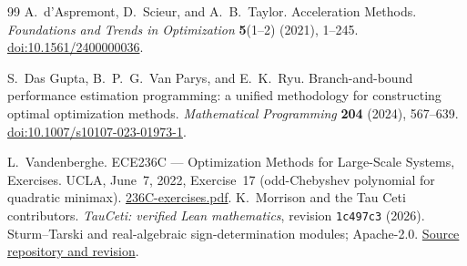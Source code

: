 \documentclass[11pt]{article}
\numberwithin{equation}{section}
\theoremstyle{definition}
\begin{document}
\begin{thebibliography}{99}
A.~d'Aspremont, D.~Scieur, and A.~B.~Taylor.
Acceleration Methods.
\emph{Foundations and Trends in Optimization} \textbf{5}(1--2) (2021), 1--245.
\href{https://doi.org/10.1561/2400000036}{doi:10.1561/2400000036}.

S.~Das Gupta, B.~P.~G.~Van Parys, and E.~K.~Ryu.
Branch-and-bound performance estimation programming: a unified methodology for constructing optimal optimization methods.
\emph{Mathematical Programming} \textbf{204} (2024), 567--639.
\href{https://doi.org/10.1007/s10107-023-01973-1}{doi:10.1007/s10107-023-01973-1}.

L.~Vandenberghe.
ECE236C --- Optimization Methods for Large-Scale Systems, Exercises.
UCLA, June~7, 2022, Exercise~17 (odd-Chebyshev polynomial for quadratic minimax).
\href{https://www.seas.ucla.edu/~vandenbe/236C/236C-exercises.pdf}{236C-exercises.pdf}.
K.~Morrison and the Tau Ceti contributors.
\emph{TauCeti: verified Lean mathematics}, revision \texttt{1c497c3} (2026).
Sturm--Tarski and real-algebraic sign-determination modules; Apache-2.0.
\href{https://github.com/TauCetiProject/TauCeti/tree/1c497c347f615b3087cb605f8cf743e591376105}{Source repository and revision}.
\end{thebibliography}
\end{document}
